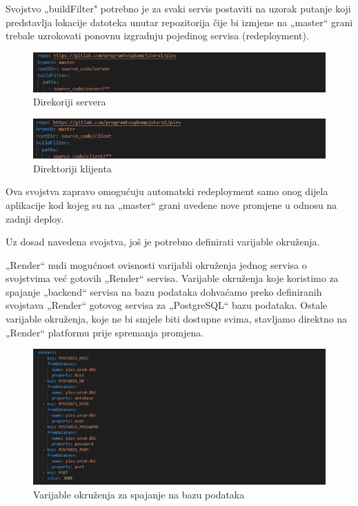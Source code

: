 Svojstvo „buildFilter" potrebno je za svaki servis postaviti na uzorak putanje koji predstavlja lokacije datoteka unutar repozitorija čije bi izmjene na „master“ grani  trebale uzrokovati ponovnu izgradnju pojedinog servisa (redeployment).
\begin{figure}[H]
			\includegraphics[scale=0.9]{slike/Slika7.PNG} %
			\centering
			\caption{Direkoriji servera}
			\label{fig:ServerRepo}
		\end{figure}
\begin{figure}[H]
			\includegraphics[scale=0.9]{slike/Slika8.PNG} %
			\centering
			\caption{Direktoriji klijenta}
			\label{fig:ClientRepo}
		\end{figure}

Ova svojstva zapravo omogućuju automatski redeployment samo onog dijela aplikacije kod kojeg su na „master“ grani uvedene nove promjene u odnosu na zadnji deploy.  

Uz dosad navedena svojstva, još je potrebno definirati varijable okruženja. 

„Render“ nudi mogućnost ovisnosti varijabli okruženja jednog servisa o svojstvima već gotovih „Render“ servisa. Varijable okruženja koje koristimo za spajanje „backend“ servisa na bazu podataka dohvaćamo preko definiranih svojstava „Render“ gotovog servisa za „PostgreSQL“ bazu podataka. Ostale varijable okruženja, koje ne bi smjele biti dostupne svima, stavljamo direktno na „Render“ platformu prije spremanja promjena.
\begin{figure}[H]
			\includegraphics[scale=0.9]{slike/Slika9.PNG} %
			\centering
			\caption{Varijable okruženja za spajanje na bazu podataka}
			\label{fig:EnvDb}
		\end{figure}

